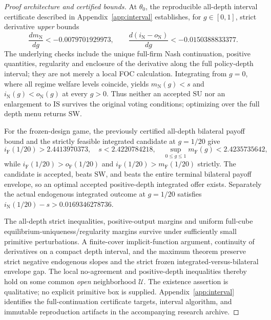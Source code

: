 \documentclass[11pt,a4paper]{article}
\theoremstyle{remark}\newtheorem{remark}[theorem]{Remark}
\newcommand{\SW}{\mathrm{SW}}\newcommand{\SU}{\mathrm{SU}}\newcommand{\IS}{\mathrm{IS}}
\newcommand{\N}{\mathrm{N}}\newcommand{\F}{\mathrm{F}}
\begin{document}
\begin{proof}[Proof architecture and certified bounds]
At $\theta_0$, the reproducible all-depth interval certificate described in Appendix~\ref{app:interval} establishes, for $g\in[0,1]$, strict derivative \emph{upper} bounds
\begin{equation}\label{eq:cert}
\frac{dm_{\N}}{dg}<-0.0079701929973,\qquad
\frac{d(i_{\N}-o_{\N})}{dg}<-0.0150388833377.
\end{equation}
The underlying checks include the unique full-firm Nash continuation, positive quantities, regularity and enclosure of the derivative along the full policy-depth interval; they are not merely a local FOC calculation. Integrating from $g=0$, where all regime welfare levels coincide, yields $m_{\N}(g)<s$ and $i_{\N}(g)<o_{\N}(g)$ at every $g>0$. Thus neither an accepted $\SU$ nor an enlargement to $\IS$ survives the original voting conditions; optimizing over the full depth menu returns $\SW$.

For the frozen-design game, the previously certified all-depth bilateral payoff bound and the strictly feasible integrated candidate at $g=1/20$ give
\begin{equation}\label{eq:frozenCert}
 i_{\F}(1/20)>2.4413970373,
\quad s<2.4220784218,
\quad\sup_{0\le g\le1}m_{\F}(g)<2.4235735642,
\end{equation}
while $i_{\F}(1/20)>o_{\F}(1/20)$ and $i_{\F}(1/20)>m_{\F}(1/20)$ strictly. The candidate is accepted, beats $\SW$, and beats the entire terminal bilateral payoff envelope, so an optimal accepted positive-depth integrated offer exists. Separately the actual endogenous integrated outcome at $g=1/20$ satisfies $i_{\N}(1/20)-s>0.0169346278736$.

The all-depth strict inequalities, positive-output margins and uniform full-cube equilibrium-uniqueness/regularity margins survive under sufficiently small primitive perturbations. A finite-cover implicit-function argument, continuity of derivatives on a compact depth interval, and the maximum theorem preserve strict negative endogenous slopes and the strict frozen integrated-versus-bilateral envelope gap. The local no-agreement and positive-depth inequalities thereby hold on some common \emph{open} neighborhood $\mathcal U$. The existence assertion is qualitative; no explicit primitive box is supplied. Appendix~\ref{app:interval} identifies the full-continuation certificate targets, interval algorithm, and immutable reproduction artifacts in the accompanying research archive.
\end{proof}
\end{document}
